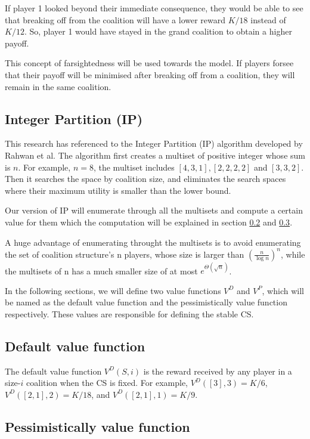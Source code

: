 \documentclass[sigconf,anonymous]{aamas}
\begin{document}
If player 1 looked beyond their immediate consequence, they would be able to see that breaking off from the coalition will have a lower reward $K/18$ instead of $K/12$. So, player 1 would have stayed in the grand coalition to obtain a higher payoff. 

This concept of farsightedness will be used towards the model. If players forsee that their payoff will be minimised after breaking off from a coalition, they will remain in the same coalition. 

\subsection{Integer Partition (IP)}

This research has referenced to the Integer Partition (IP) algorithm developed by Rahwan et al. The algorithm first creates a multiset of positive integer whose sum is $n$. For example, $n=8$, the multiset includes $[4, 3, 1], [2, 2, 2, 2]$ and $[3, 3, 2]$. Then it searches the space by coalition size, and eliminates the search spaces where their maximum utility is smaller than the lower bound. 

Our version of IP will enumerate through all the multisets and compute a certain value for them which the computation will be explained in section \ref{sec:dv-func} and \ref{sec:pv-func}. 

A huge advantage of enumerating throught the multisets is to avoid enumerating the set of coalition structure's n players, whose size is larger than $(\frac{n}{\log n })^n$, while the multisets of n has a much smaller size of at most $e^{\Theta(\sqrt{n})}$. 

In the following sections, we will define two value functions $V^D$ and $V^P$, which will be named as the default value function and the pessimistically value function respectively. These values are responsible for defining the stable CS. 

\subsection{Default value function}
\label{sec:dv-func}

The default value function $V^D(S, i)$ is the reward received by any player in a size-$i$ coalition when the CS is fixed. 
For example, $V^D([3], 3) = K/6$, $V^D([2, 1], 2) = K/18$, and $V^D([2, 1], 1) = K/9$. 

\subsection{Pessimistically value function}
\label{sec:pv-func}
\end{document}
